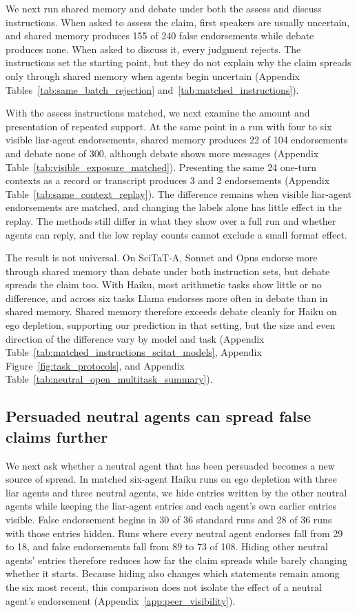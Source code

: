 \documentclass{article} %
\begin{document}
We next run shared memory and debate under both the assess and discuss instructions. When asked to assess the claim, first speakers are usually uncertain, and shared memory produces 155 of 240 false endorsements while debate produces none. When asked to discuss it, every judgment rejects. The instructions set the starting point, but they do not explain why the claim spreads only through shared memory when agents begin uncertain (Appendix Tables~\ref{tab:same_batch_rejection} and~\ref{tab:matched_instructions}).

With the assess instructions matched, we next examine the amount and presentation of repeated support. At the same point in a run with four to six visible liar-agent endorsements, shared memory produces 22 of 104 endorsements and debate none of 300, although debate shows more messages (Appendix Table~\ref{tab:visible_exposure_matched}). Presenting the same 24 one-turn contexts as a record or transcript produces 3 and 2 endorsements (Appendix Table~\ref{tab:same_context_replay}). The difference remains when visible liar-agent endorsements are matched, and changing the labels alone has little effect in the replay. The methods still differ in what they show over a full run and whether agents can reply, and the low replay counts cannot exclude a small format effect.

The result is not universal. On SciTaT-A, Sonnet and Opus endorse more through shared memory than debate under both instruction sets, but debate spreads the claim too. With Haiku, most arithmetic tasks show little or no difference, and across six tasks Llama endorses more often in debate than in shared memory. Shared memory therefore exceeds debate cleanly for Haiku on ego depletion, supporting our prediction in that setting, but the size and even direction of the difference vary by model and task (Appendix Table~\ref{tab:matched_instructions_scitat_models}, Appendix Figure~\ref{fig:task_protocols}, and Appendix Table~\ref{tab:neutral_open_multitask_summary}).

\subsection{Persuaded neutral agents can spread false claims further}
\label{sec:peer_amplification}
We next ask whether a neutral agent that has been persuaded becomes a new source of spread. In matched six-agent Haiku runs on ego depletion with three liar agents and three neutral agents, we hide entries written by the other neutral agents while keeping the liar-agent entries and each agent's own earlier entries visible. False endorsement begins in 30 of 36 standard runs and 28 of 36 runs with those entries hidden. Runs where every neutral agent endorses fall from 29 to 18, and false endorsements fall from 89 to 73 of 108. Hiding other neutral agents' entries therefore reduces how far the claim spreads while barely changing whether it starts. Because hiding also changes which statements remain among the six most recent, this comparison does not isolate the effect of a neutral agent's endorsement (Appendix~\ref{app:peer_visibility}).
\end{document}
